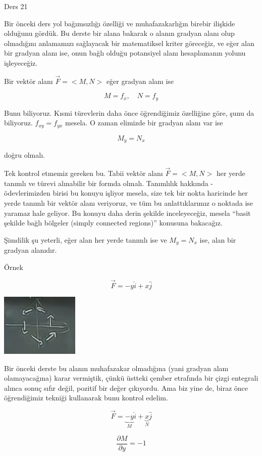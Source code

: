\documentclass[12pt,fleqn]{article}\usepackage{../../common}
\begin{document}
Ders 21

Bir önceki ders yol bağımsızlığı özelliği ve muhafazakarlığın birebir ilişkide
olduğunu gördük. Bu derste bir alana bakarak o alanın gradyan alanı olup
olmadığını anlamamızı sağlayacak bir matematiksel kriter göreceğiz, ve eğer alan
bir gradyan alanı ise, onun bağlı olduğu potansiyel alanı hesaplamanın yolunu
işleyeceğiz.

Bir vektör alanı $\vec{F} = < M,N >$ eğer gradyan alanı ise 

$$ M = f_x, \quad N = f_y $$

Bunu biliyoruz. Kısmi türevlerin daha önce öğrendiğimiz özelliğine göre, şunu da
biliyoruz. $f_{xy} = f_{yx}$ mesela. O zaman elimizde bir gradyan alanı var ise

$$ M_y = N_x $$

doğru olmalı. 

Tek kontrol etmemiz gereken bu. Tabii vektör alanı $\vec{F} = < M,N >$ her yerde
tanımlı ve türevi alınabilir bir formda olmalı. Tanımlılık hakkında -
ödevlerimizden birisi bu konuyu işliyor mesela, size tek bir nokta haricinde her
yerde tanımlı bir vektör alanı veriyoruz, ve tüm bu anlattıklarımız o noktada
ise yaramaz hale geliyor. Bu konuyu daha derin şekilde inceleyeceğiz, mesela
``basit şekilde bağlı bölgeler (simply connected regions)'' konusuna bakacağız.

Şimdilik şu yeterli, eğer alan her yerde tanımlı ise ve $M_y = N_x$ ise,
alan bir gradyan alanıdır. 

Örnek 

$$ \vec{F} = -y\hat{i} + x\hat{j} $$

\includegraphics[height=3cm]{21_1.png}

Bir önceki derste bu alanın muhafazakar olmadığına (yani gradyan alanı
olamayacağına) karar vermiştik, çünkü üstteki çember etrafında bir çizgi
entegrali alınca sonuç sıfır değil, pozitif bir değer çıkıyordu. Ama biz yine
de, biraz önce öğrendiğimiz tekniği kullanarak bunu kontrol edelim.

$$ \vec{F} = \underbrace{-y}_{M}\hat{i} + 
\underbrace{x}_{N}\hat{j} 
$$

$$ \frac{\partial M}{\partial y} = -1 $$
\end{document}
